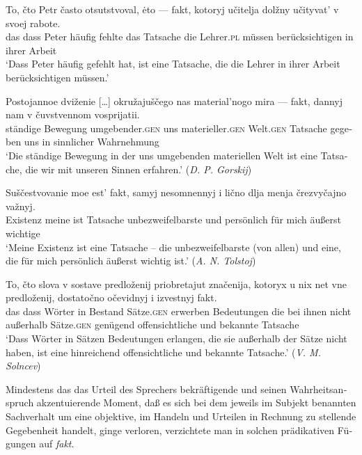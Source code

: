 \documentclass[output=paper]{langscibook}
\begin{document}
\begin{otherlanguage}{german}
\ea \label{ex:zi83:35}
    \gll To, čto Petr často otsutstvoval, ėto — fakt, kotoryj učitelja dolžny učityvat’ v svoej rabote. \\
    das dass Peter häufig fehlte das {} Tatsache die Lehrer.\textsc{pl} müssen berücksichtigen in ihrer Arbeit \\
    \glt ‘Dass Peter häufig gefehlt hat, ist eine Tatsache, die die Lehrer in ihrer Arbeit berücksichtigen müssen.’
    
\ex \label{ex:zi83:36}
    \gll Postojannoe dviženie […] okružajuščego nas material’nogo mira — fakt, dannyj nam v čuvstvennom vosprijatii.  \\
    ständige Bewegung {} umgebender.\textsc{gen} uns materieller.\textsc{gen} Welt.\textsc{gen} {}  Tatsache gegeben uns in  sinnlicher Wahrnehmung  \\
    \glt ‘Die ständige Bewegung in der uns umgebenden materiellen Welt ist eine Tatsache, die wir mit unseren Sinnen erfahren.’ (\textit{D. P. Gorskij})
    
\ex \label{ex:zi83:37}
    \gll Suščestvovanie moe est’ fakt, {samyj nesomnennyj} i lično dlja menja črezvyčajno važnyj.  \\
    Existenz meine ist  Tatsache   unbezweifelbarste und persönlich für mich äußerst wichtige \\
    \glt ‘Meine Existenz ist eine Tatsache -- die unbezweifelbarste (von allen) und eine, die für mich persönlich äußerst wichtig ist.’ (\textit{A. N. Tolstoj})
    
\ex \label{ex:zi83:38}
    \gll To, čto slova v sostave predloženij priobretajut značenija, kotoryx u nix net vne predloženij, dostatočno očevidnyj i izvestnyj fakt. \\
    das dass  Wörter in Bestand Sätze.\textsc{gen} erwerben Bedeutungen die bei ihnen nicht  außerhalb Sätze.\textsc{gen} genügend offensichtliche und bekannte Tatsache \\
    \glt ‘Dass Wörter in Sätzen Bedeutungen erlangen, die sie außerhalb der Sätze nicht haben, ist eine hinreichend offensichtliche und bekannte Tatsache.’ (\textit{V. M. Solncev})

\z

\noindent Mindestens das das Urteil des Sprechers bekräftigende und seinen Wahrheits\-anspruch akzentuierende Moment, daß es sich bei dem jeweils im Subjekt benannten Sachverhalt um eine objektive, im Handeln und Urteilen in Rechnung zu stellende Gegebenheit handelt, ginge verloren, verzichtete man in solchen prädikativen Fügungen auf \textit{fakt}.


\end{otherlanguage}
\end{document}
